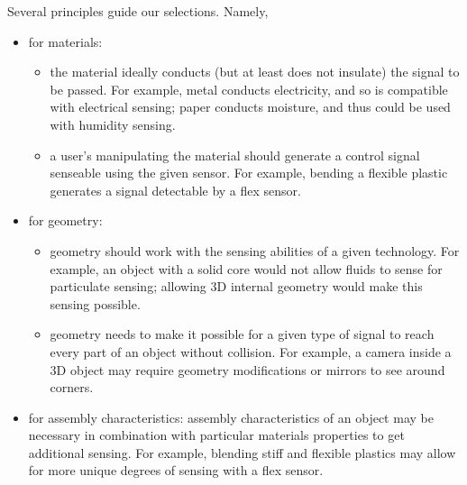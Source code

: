     Several principles guide our selections. Namely,
    \begin{itemize}
      \item for materials: \begin{itemize}
        \item the material ideally conducts (but at least does not insulate) the signal to be passed. For example, metal conducts electricity, and so is compatible with electrical sensing; paper conducts moisture, and thus could be used with humidity sensing.%
        \item a user's manipulating the material should generate a control signal senseable using the given sensor. For example, bending a flexible plastic generates a signal detectable by a flex sensor. %
        \end{itemize}
      
      \item for geometry: \begin{itemize}
        \item geometry should work with the sensing abilities of a given technology. For example, an object with a solid core would not allow fluids to sense for particulate sensing; allowing 3D internal geometry would make this sensing possible.
        \item geometry needs to make it possible for a given type of signal to reach every part of an object without collision. For example, a camera inside a 3D object may require geometry modifications  or mirrors to see around corners. 
        \end{itemize}
      
      \item for assembly characteristics: assembly characteristics of an object may be necessary in combination with particular materials properties to get additional sensing. For example, blending stiff and flexible plastics may allow for more unique degrees of sensing with a flex sensor. 
      
    \end{itemize}
    
